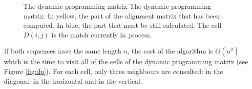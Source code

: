 \begin{center}
\end{center}

\begin{figure}[t!]
\begin{center}
\setlength{\fboxsep}{0pt}
          {The dynamic programming matrix}%
          {The dynamic programming matrix.}%
          {In yellow, the part of the alignment matrix that has been computed. In blue, the part that must be still calculated. The cell $D(i,j)$ is the match currently in process.}
\end{center}
\end{figure}

If both sequences have the same length $n$, the cost of the \citeauthor{sellers:1974a} algorithm is 
$O(n^2)$ which is the time to visit all of the cells of the dynamic programming matrix (see Figure 
\ref{fig:dp}). For each cell, only three neighbours are consulted: in the diagonal, in the horizontal
and in the vertical.

